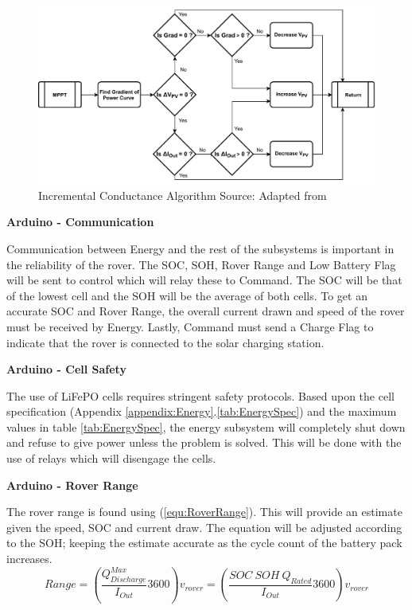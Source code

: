 \documentclass[10pt,twoside]{article}
\begin{document}
\begin{figure}[hbt!]
    \centering
    \includegraphics[scale = 0.7]{IncrementalConductance2 (2).pdf}
    \caption{Incremental Conductance Algorithm \quad Source: Adapted from \cite{Choudhary2014IncrementalConverter}}
    \label{fig:IncrementalConductance}
\end{figure}

\textbf{Arduino - Communication}

Communication between Energy and the rest of the subsystems is important in the reliability of the rover. The SOC, SOH, Rover Range and Low Battery Flag will be sent to control which will relay these to Command. The SOC will be that of the lowest cell and the SOH will be the average of both cells. To get an accurate SOC and Rover Range, the overall current drawn and speed of the rover must be received by Energy. Lastly, Command must send a Charge Flag to indicate that the rover is connected to the solar charging station. 

\textbf{Arduino - Cell Safety}

The use of LiFePO cells requires stringent safety protocols. Based upon the cell specification (Appendix \ref{appendix:Energy}.\ref{tab:EnergySpec}) and the maximum values in table \ref{tab:EnergySpec}, the energy subsystem will completely shut down and refuse to give power unless the problem is solved. This will be done with the use of relays which will disengage the cells.

\textbf{Arduino - Rover Range}

The rover range is found using (\ref{equ:RoverRange}). This will provide an estimate given the speed, SOC and current draw. The equation will be adjusted according to the SOH; keeping the estimate accurate as the cycle count of the battery pack increases.   
\begin{equation}
    Range = \left(\frac{Q_{Discharge}^{Max}}{I_{Out}}3600\right) v_{rover} = \left(\frac{SOC \ SOH \ Q_{Rated} }{I_{Out}} 3600\right) v_{rover}      
    \label{equ:RoverRange}
\end{equation}
\end{document}
